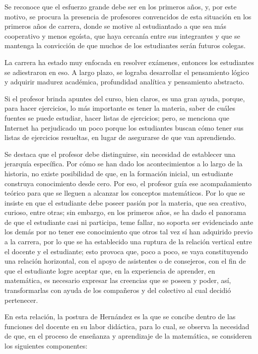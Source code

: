 Se reconoce que el esfuerzo grande debe ser en los primeros años, y, por este motivo, se procura la presencia de profesores convencidos de esta situación en los primeros años de carrera, donde se motive al estudiantado a que sea más cooperativo y menos egoísta, que haya cercanía entre sus integrantes y que se mantenga la convicción de que muchos de los estudiantes serán futuros colegas. 

La carrera ha estado muy enfocada en resolver exámenes, entonces los estudiantes se adiestraron en eso. A largo plazo, se lograba desarrollar el pensamiento lógico y adquirir madurez académica, profundidad analítica y pensamiento abstracto. 

Si el profesor brinda apuntes del curso, bien claros, es una gran ayuda, porque, para hacer ejercicios, lo más importante es tener la materia, saber de cuáles fuentes se puede estudiar, hacer listas de ejercicios; pero, se menciona que Internet ha perjudicado un poco porque los estudiantes buscan cómo tener sus listas de ejercicios resueltas, en lugar de asegurarse de que van aprendiendo. 

Se destaca que el profesor debe distinguirse, sin necesidad de establecer una jerarquía específica. Por cómo se han dado los acontecimientos a lo largo de la historia, no existe posibilidad de que, en la formación inicial, un estudiante construya conocimiento desde cero. Por eso, el profesor guía ese acompañamiento teórico para que se lleguen a alcanzar los conceptos matemáticos. Por lo que se insiste en que el estudiante debe poseer pasión por la materia, que sea creativo, curioso, entre otras; sin embargo, en los primeros años, se ha dado el panorama de que el estudiante casi ni participa, teme fallar, no soporta ser evidenciado ante los demás por no tener ese conocimiento que otros tal vez sí han adquirido previo a la carrera, por lo que se ha establecido una ruptura de la relación vertical entre el docente y el estudiante; esto provoca que, poco a poco, se vaya constituyendo una relación horizontal, con el apoyo de asistentes o de consejeros, con el fin de que el estudiante logre aceptar que, en la experiencia de aprender, en matemática, es necesario expresar las creencias que se poseen y poder, así, transformarlas con ayuda de los compañeros y del colectivo al cual decidió pertenecer. 

En esta relación, la postura de Hernández \cite{hernandez2017metodo} es la que se concibe dentro de las funciones del docente en su labor didáctica, para lo cual, se observa la necesidad de que, en el proceso de enseñanza y aprendizaje de la matemática, se consideren los siguientes componentes: 

